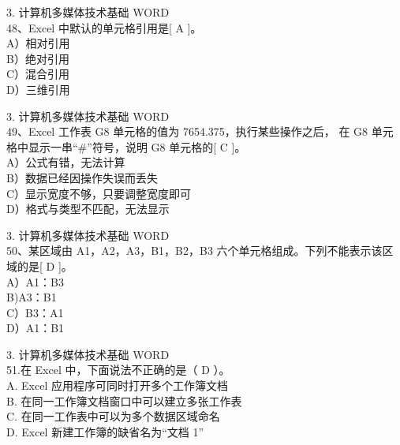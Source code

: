 \documentclass[aspectratio=169]{beamer}
\begin{document}
\begin{frame}[t]{3. 计算机多媒体技术基础} \vspace{20pt}
    WORD\\


48、Excel 中默认的单元格引用是[ A ]。\\
A）相对引用\\
    B）绝对引用\\ C）混合引用\\ D）三维引用\\
\end{frame}



\begin{frame}[t]{3. 计算机多媒体技术基础} \vspace{20pt}
    WORD\\
49、Excel 工作表 G8 单元格的值为 7654.375，执行某些操作之后，
在 G8 单元格中显示一串“\#”符号，说明 G8 单元格的[ C ]。\\
A）公式有错，无法计算\\ B）数据已经因操作失误而丢失\\
C）显示宽度不够，只要调整宽度即可\\ D）格式与类型不匹配，无法显示
\end{frame}



\begin{frame}[t]{3. 计算机多媒体技术基础} \vspace{20pt}
    WORD\\
50、某区域由 A1，A2，A3，B1，B2，B3 六个单元格组成。下列不能表示该区域的是[ D ]。\\
A）A1：B3\\ B)A3：B1\\ C）B3：A1\\ D）A1：B1\\
\end{frame}


\begin{frame}[t]{3. 计算机多媒体技术基础} \vspace{20pt}
    WORD\\

51.在 Excel 中，下面说法不正确的是（ D ）。\\
A. Excel 应用程序可同时打开多个工作簿文档\\
B. 在同一工作簿文档窗口中可以建立多张工作表\\
C. 在同一工作表中可以为多个数据区域命名\\
D. Excel 新建工作簿的缺省名为“文档 1”\\
\end{frame}
\end{document}

